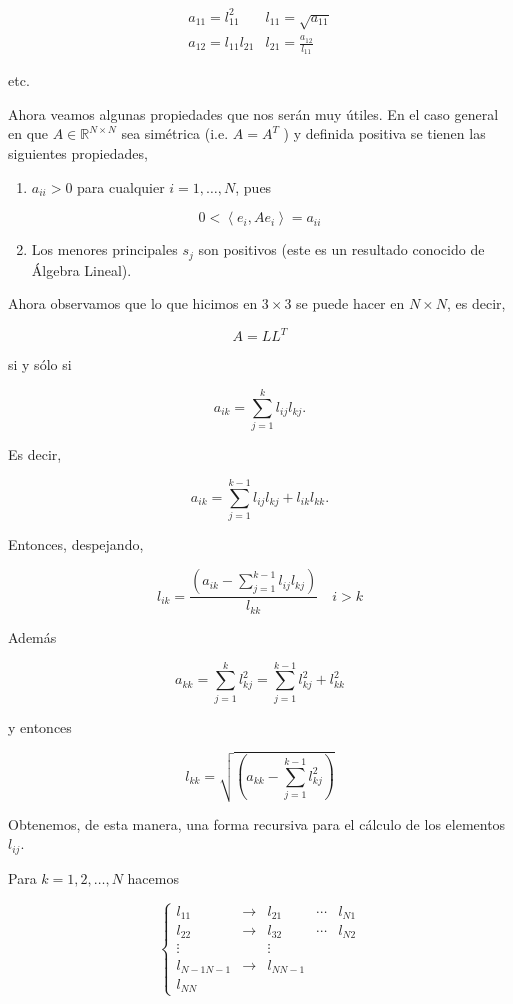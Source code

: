 \documentclass[10pt]{book}
\begin{document}
$$
\begin{array}{cr}
a_{11}=l_{11}^{2} & l_{11}=\sqrt{a_{11}} \\
a_{12}=l_{11} l_{21} & l_{21}=\frac{a_{12}}{l_{11}}
\end{array}
$$

etc.

Ahora veamos algunas propiedades que nos serán muy útiles. En el caso general en que $A \in \mathbb{R}^{N \times N}$ sea simétrica (i.e. $A=A^{T}$ ) y definida positiva se tienen las siguientes propiedades,

\begin{enumerate}
  \item $a_{i i}>0$ para cualquier $i=1, \ldots, N$, pues
\end{enumerate}

$$
0<\left\langle e_{i}, A e_{i}\right\rangle=a_{i i}
$$

\begin{enumerate}
  \setcounter{enumi}{1}
  \item Los menores principales $s_{j}$ son positivos (este es un resultado conocido de Álgebra Lineal).
\end{enumerate}

Ahora observamos que lo que hicimos en $3 \times 3$ se puede hacer en $N \times N$, es decir,

$$
A=L L^{T}
$$

si y sólo si

$$
a_{i k}=\sum_{j=1}^{k} l_{i j} l_{k j} .
$$

Es decir,

$$
a_{i k}=\sum_{j=1}^{k-1} l_{i j} l_{k j}+l_{i k} l_{k k} .
$$

Entonces, despejando,

$$
l_{i k}=\frac{\left(a_{i k}-\sum_{j=1}^{k-1} l_{i j} l_{k j}\right)}{l_{k k}} \quad i>k
$$

Además

$$
a_{k k}=\sum_{j=1}^{k} l_{k j}^{2}=\sum_{j=1}^{k-1} l_{k j}^{2}+l_{k k}^{2}
$$

y entonces

$$
l_{k k}=\sqrt{\left(a_{k k}-\sum_{j=1}^{k-1} l_{k j}^{2}\right)}
$$

Obtenemos, de esta manera, una forma recursiva para el cálculo de los elementos $l_{i j}$.

Para $k=1,2, \ldots, N$ hacemos

$$
\left\{\begin{array}{ccccc}
l_{11} & \rightarrow & l_{21} & \cdots & l_{N 1} \\
l_{22} & \rightarrow & l_{32} & \cdots & l_{N 2} \\
\vdots & & \vdots & & \\
l_{N-1 N-1} & \rightarrow & l_{N N-1} & & \\
l_{N N} & & & &
\end{array}\right.
$$
\end{document}
